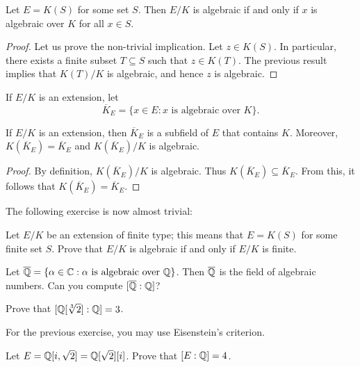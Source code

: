 \begin{corollary}
\label{cor:finite type algebraic}
	Let $E=K(S)$ for some set $S$. Then $E/K$ is algebraic if and only if
	$x$ is algebraic over $K$ for all $x\in S$. 
\end{corollary}

\begin{proof}
	Let us prove the non-trivial implication. Let $z\in K(S)$. In particular, 
	there exists a finite subset $T\subseteq S$ such that 
	$z\in K(T)$. The previous result implies that $K(T)/K$ is algebraic, and
	hence $z$ is algebraic. 
\end{proof}

If $E/K$ is an extension, let 
\[
	\overline{K}_E=\{x\in E:x\text{ is algebraic over }K\}. 
\]

\begin{corollary}
	If $E/K$ is  an extension, then $\overline{K}_E$ 
	is a subfield of $E$ that contains $K$. Moreover, 
	$K(\overline{K}_E)=\overline{K}_E$ and 
        $K(\overline{K}_E)/K$ is algebraic. 
\end{corollary}	

\begin{proof}
    By definition, $K(\overline{K}_E)/K$ is algebraic. 
    Thus $K(\overline{K}_E)\subseteq\overline{K}_E$. From this, it follows that
    $K(\overline{K}_E)=\overline{K}_E$. 
\end{proof}

The following exercise is now almost trivial:

\begin{exercise}
\label{xca:finite type}
    Let $E/K$ be an extension of finite type; this means 
    that  
    $E=K(S)$ for some finite
    set $S$.  
    Prove that $E/K$ is algebraic if and only if $E/K$ 
    is finite. 
\end{exercise}

Let $\overline{\mathbb{Q}}=\{\alpha\in\mathbb{C}:\alpha\text{ is algebraic over }\mathbb{Q}\}$. 
Then $\overline{\mathbb{Q}}$ is the field of algebraic numbers. 
Can you compute $[\overline{\mathbb{Q}}:\mathbb{Q}]$?

\begin{exercise}
\label{xca:degree of sqrt[3]2}
    Prove that $[\mathbb{Q}[\sqrt[3]{2}]:\mathbb{Q}]=3$. 
\end{exercise}

For the previous exercise, you may use Eisenstein's criterion. 

\begin{exercise}
\label{xca:Q(i,sqrt2)}
    Let $E=\mathbb{Q}[i,\sqrt{2}]=\mathbb{Q}[\sqrt{2}][i]$. Prove that $[E:\mathbb{Q}]=4$.  
\end{exercise}

